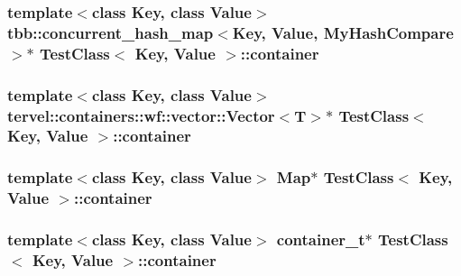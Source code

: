 \subsubsection[{container}]{\setlength{\rightskip}{0pt plus 5cm}template$<$class Key, class Value$>$ tbb\+::concurrent\+\_\+hash\+\_\+map$<$Key, {\bf Value}, {\bf My\+Hash\+Compare}$>$$\ast$ {\bf Test\+Class}$<$ Key, {\bf Value} $>$\+::container\hspace{0.3cm}{\ttfamily [private]}}\label{class_test_class_a45c01f347cfca94da55b3f8f626e4a01}
\hypertarget{class_test_class_a188a7b0e4dba55a763a64328e9015d5d}{}
\subsubsection[{container}]{\setlength{\rightskip}{0pt plus 5cm}template$<$class Key, class Value$>$ tervel\+::containers\+::wf\+::vector\+::\+Vector$<$T$>$$\ast$ {\bf Test\+Class}$<$ Key, {\bf Value} $>$\+::container\hspace{0.3cm}{\ttfamily [private]}}\label{class_test_class_a188a7b0e4dba55a763a64328e9015d5d}
\hypertarget{class_test_class_afd26cf553caeb881f2d24252b973a398}{}
\subsubsection[{container}]{\setlength{\rightskip}{0pt plus 5cm}template$<$class Key, class Value$>$ {\bf Map}$\ast$ {\bf Test\+Class}$<$ Key, {\bf Value} $>$\+::container\hspace{0.3cm}{\ttfamily [private]}}\label{class_test_class_afd26cf553caeb881f2d24252b973a398}
\hypertarget{class_test_class_abe4e24c68b92dd93f411f3b7e62e8cde}{}
\subsubsection[{container}]{\setlength{\rightskip}{0pt plus 5cm}template$<$class Key, class Value$>$ {\bf container\+\_\+t}$\ast$ {\bf Test\+Class}$<$ Key, {\bf Value} $>$\+::container\hspace{0.3cm}{\ttfamily [private]}}\label{class_test_class_abe4e24c68b92dd93f411f3b7e62e8cde}
\hypertarget{class_test_class_a82e6fb0f71bfaeab7623660b1c6d5801}{}
